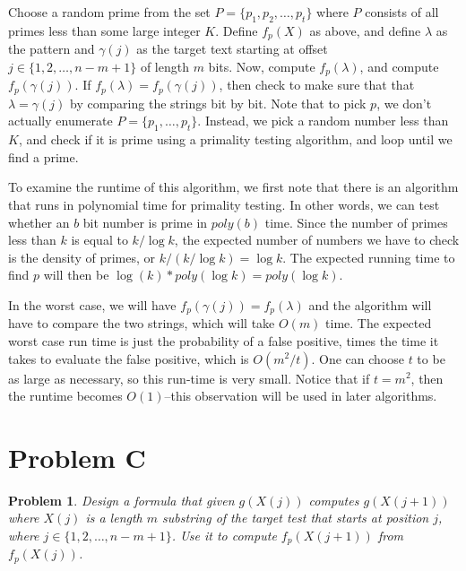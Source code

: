 \documentclass[psamsfonts]{amsart}
\newtheorem{prob}{Problem}[section]
\newenvironment{sol}{{\bfseries Solution}}{\qedsymbol}
\theoremstyle{definition}
\theoremstyle{remark}
\numberwithin{equation}{section}
\begin{document}
\begin{sol}
Choose a random prime from the set $P = \{p_1, p_2, \ldots, p_t \}$ where $P$ consists of all primes less than some large integer $K$. Define $f_p(X)$ as above, and define $\lambda$ as the pattern and $\gamma(j)$ as the target text starting at offset $j \in \{1, 2, \ldots, n-m+1\}$ of length $m$ bits. Now, compute $f_p(\lambda)$, and compute $f_p(\gamma(j))$. If $f_p(\lambda) = f_p(\gamma(j))$, then check to make sure that that $\lambda = \gamma(j)$ by comparing the strings bit by bit. Note that to pick $p$, we don't actually enumerate $P = \{p_1, \ldots, p_t \}$. Instead, we pick a random number less than $K$, and check if it is prime using a primality testing algorithm, and loop until we find a prime. 

To examine the runtime of this algorithm, we first note that there is an algorithm that runs in polynomial time for primality testing. In other words, we can test whether an $b$ bit number is prime in $poly(b)$ time. Since the number of primes less than $k$ is equal to $k / \log k$, the expected number of numbers we have to check is the density of primes, or $k / (k / \log k) = \log k$. The expected running time to find $p$ will then be $\log(k) * poly(\log k) = poly(\log k)$. 

In the worst case, we will have $f_p(\gamma(j)) = f_p(\lambda)$ and the algorithm will have to compare the two strings, which will take $O(m)$ time. The expected worst case run time is just the probability of a false positive, times the time it takes to evaluate the false positive, which is $O(m^2/t)$. One can choose $t$ to be as large as necessary, so this run-time is very small. Notice that if $t = m^2$, then the runtime becomes $O(1)$--this observation will be used in later algorithms. 
\end{sol}

\section{Problem C}

\begin{prob}
Design a formula that given $g(X(j))$ computes $g(X(j+1))$ where $X(j)$ is a length $m$ substring of the target test that starts at position $j$, where $j \in \{1,2,\ldots,n-m+1\}$. Use it to compute $f_p(X(j+1))$ from $f_p(X(j))$. 
\end{prob}
\end{document}
